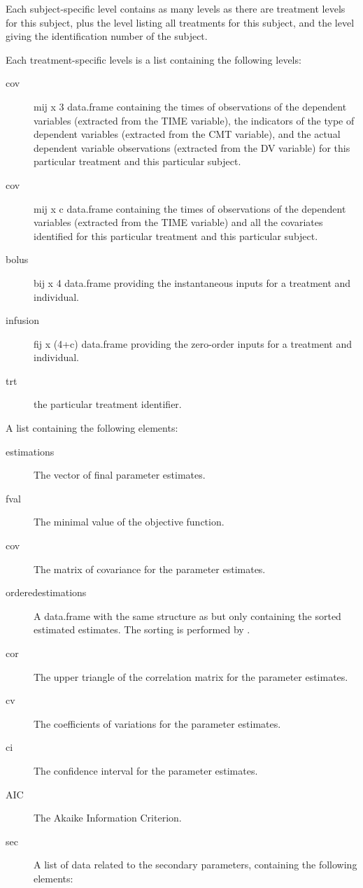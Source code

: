 \begin{Arguments}
\begin{ldescription}
\begin{description}
Each subject-specific level contains as many levels as there are treatment
levels for this subject, plus the  level listing all treatments
for this subject, and the  level giving the identification number
of the subject. 

Each treatment-specific levels is a list containing the following levels: 
\begin{description}

\item[cov] mij x 3 data.frame containing the times of observations of the
dependent variables (extracted from the TIME variable), the indicators
of the type of dependent variables (extracted from the CMT variable),
and the actual dependent variable observations (extracted from the 
DV variable) for this particular treatment and this particular 
subject.
\item[cov] mij x c data.frame containing the times of observations of 
the dependent variables (extracted from the TIME variable) and all the
covariates identified for this particular treatment and this 
particular subject.
\item[bolus] bij x 4 data.frame providing the instantaneous inputs for
a treatment and individual.
\item[infusion] fij x (4+c) data.frame providing the zero-order inputs for
a treatment and individual.
\item[trt] the particular treatment identifier.
\end{description}



\end{description}


\item[\code{Fit}] A list containing the following elements:\begin{description}

\item[estimations] The vector of final parameter estimates.
\item[fval] The minimal value of the objective function.
\item[cov] The matrix of covariance for the parameter estimates.
\item[orderedestimations] A data.frame with the same structure as
 but only containing the sorted estimated estimates.
The sorting is performed by .
\item[cor] The upper triangle of the correlation matrix for the parameter
estimates.
\item[cv] The coefficients of variations for the parameter estimates.
\item[ci] The confidence interval for the parameter estimates.
\item[AIC] The Akaike Information Criterion.
\item[sec] A list of data related to the secondary parameters, containing
the following elements:\begin{description}


\end{description}
\end{description}
\end{ldescription}
\end{Arguments}
